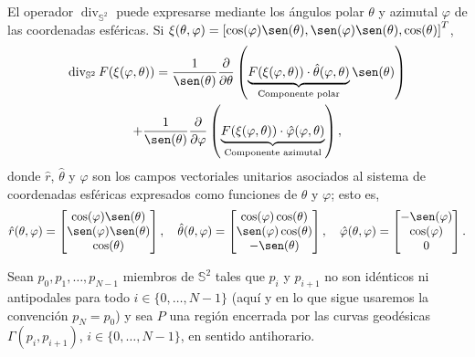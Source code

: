 \documentclass[reqno]{amsart}
\begin{document}
El operador $\operatorname{div}_{\mathbb{S}^2}$ puede expresarse mediante los ángulos polar $\theta$ y azimutal $\varphi$ de las coordenadas esféricas.
Si $\xi(\theta,\varphi) = \left[ \cos(\varphi) \sen(\theta), \sen(\varphi) \sen(\theta), \cos(\theta) \right]^T$,
%
\begin{multline}
\operatorname{div}_{\mathbb{S}^2} F(\xi(\varphi,\theta))
= \frac{1}{\sen(\theta)} \frac{\partial}{\partial \theta}\left( \underbrace{F(\xi(\varphi,\theta)) \cdot \hat \theta(\varphi,\theta)}_{\text{Componente polar}} \sen(\theta) \right)\\ + \frac{1}{\sen(\theta)} \frac{\partial}{\partial \varphi}\left( \underbrace{F(\xi(\varphi,\theta)) \cdot \hat \varphi(\varphi,\theta)}_{\text{Componente azimutal}} \right),
\end{multline}
%
donde $\hat r$, $\hat \theta$ y $\hat \varphi$ son los campos vectoriales unitarios asociados al sistema de coordenadas esféricas expresados como funciones de $\theta$ y $\varphi$; esto es,
%
\begin{equation*}
\hat r(\theta,\varphi) = \begin{bmatrix} \cos(\varphi) \sen(\theta)\\ \sen(\varphi) \sen(\theta)\\ \cos(\theta) \end{bmatrix}, \quad
\hat \theta(\theta,\varphi) = \begin{bmatrix} \cos(\varphi) \cos(\theta)\\ \sen(\varphi) \cos(\theta)\\ -\sen(\theta) \end{bmatrix}, \quad
\hat \varphi(\theta,\varphi) = \begin{bmatrix} -\sen(\varphi)\\ \cos(\varphi)\\ 0 \end{bmatrix}.
\end{equation*}
%

Sean $p_0, p_1, \dotsc, p_{N-1}$ miembros de $\mathbb{S}^2$ tales que $p_i$ y $p_{i+1}$ no son idénticos ni antipodales para todo $i \in \{0, \dotsc, N-1\}$ (aquí y en lo que sigue usaremos la convención $p_N = p_0$) y sea $P$ una región encerrada por las curvas geodésicas $\Gamma(p_i, p_{i+1})$, $i \in \{0, \dotsc, N-1\}$, en sentido antihorario.
\end{document}
